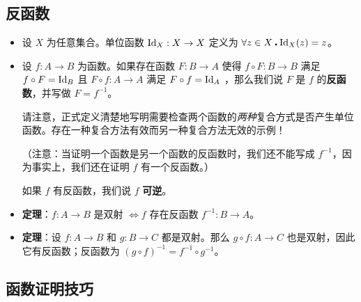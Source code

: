 \subsection{反函数}

\begin{itemize}
    \item 设 $X$ 为任意集合。单位函数 $\text{Id}_X : X \to X$ 定义为 $\forall z \in X \centerdot \text{Id}_X(z) = z$。
    \item 设 $f : A \to B$ 为函数。如果存在函数 $F : B \to A$ 使得 $f \circ F : B \to B$ 满足 $f \circ F = \text{Id}_B$ 且 $F \circ f : A \to A$ 满足 $F \circ f = \text{Id}_A$ ，那么我们说 $F$ 是 $f$ 的\textbf{反函数}，并写做 $F = f^{-1}$。

          请注意，正式定义清楚地写明需要检查两个函数的\emph{两种}复合方式是否产生单位函数。存在一种复合方法有效而另一种复合方法无效的示例！

          （注意：当证明一个函数是另一个函数的反函数时，我们还不能写成 $f^{-1}$，因为事实上，我们还在证明 $f$ 有一个反函数。）

          如果 $f$ 有反函数，我们说 $f$ \textbf{可逆}。
    \item \textbf{定理}：$f : A \to B$ 是双射 $\iff f$ 存在反函数 $f^{-1}: B \to A$。
    \item \textbf{定理}：设 $f : A \to B$ 和 $g : B \to C$ 都是双射。那么 $g \circ f : A \to C$ 也是双射，因此它有反函数；反函数为 $(g \circ f)^{-1} = f^{-1} \circ g^{-1}$。
\end{itemize}

\subsection{函数证明技巧}

